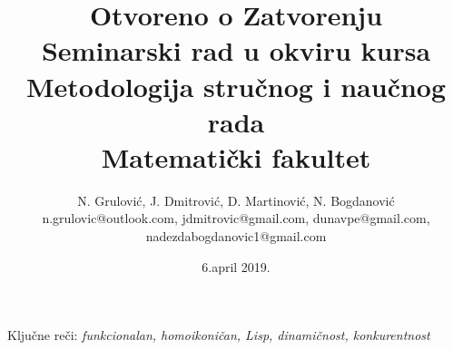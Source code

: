 \documentclass[a4paper]{article}
\begin{document}
\title{Otvoreno o Zatvorenju\\ \small{Seminarski rad u okviru kursa\\Metodologija stručnog i naučnog rada\\ Matematički fakultet}}

\author{N. Grulović, J. Dmitrović, D. Martinović, N. Bogdanović\\ \small{n.grulovic@outlook.com, jdmitrovic@gmail.com, dunavpe@gmail.com, nadezdabogdanovic1@gmail.com}}

\date{6.april 2019.}

\maketitle


Ključne reči: \textit{funkcionalan, homoikoničan, Lisp, dinamičnost, konkurentnost}

\tableofcontents

\newpage




\newpage











\newpage



\newpage


\appendix
 

\end{document}

